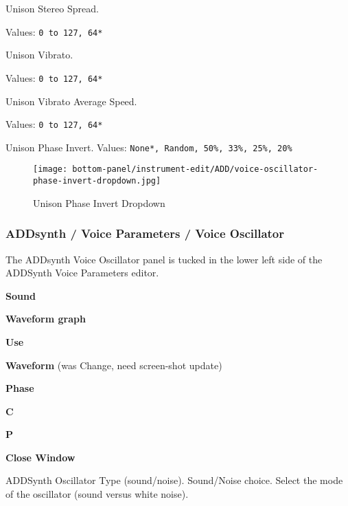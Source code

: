    Unison Stereo Spread.

   Values: \texttt{0 to 127, 64*}

   Unison Vibrato.

   Values: \texttt{0 to 127, 64*}

   Unison Vibrato Average Speed.

   Values: \texttt{0 to 127, 64*}

   Unison Phase Invert.
   Values: \texttt{None*, Random, 50\%, 33\%, 25\%, 20\%}

\begin{figure}[H]
   \centering
   \texttt{[image: bottom-panel/instrument-edit/ADD/voice-oscillator-phase-invert-dropdown.jpg]}
   \caption{Unison Phase Invert Dropdown}
   \label{fig:phase_invert_dropdown}
\end{figure}


\subsubsection{ADDsynth / Voice Parameters / Voice Oscillator}
\label{subsubsec:addsynth_voice_parameters_oscillator}

   The ADDsynth Voice Oscillator panel is tucked in the lower left side of the
   ADDSynth Voice Parameters editor.

   \begin{enumber}
      \item \textbf{Sound}
      \item \textbf{Waveform graph}
      \item \textbf{Use}
      \item \textbf{Waveform} (was Change, need screen-shot update)
      \item \textbf{Phase}
      \item \textbf{C}
      \item \textbf{P}
      \item \textbf{Close Window}
   \end{enumber}


   \setcounter{ItemCounter}{0}      %

   ADDSynth Oscillator Type (sound/noise).
   Sound/Noise choice.
   Select the mode of the oscillator (sound versus white noise).

